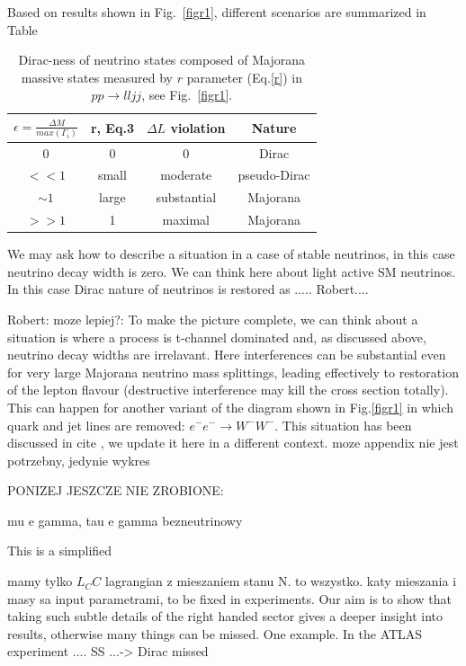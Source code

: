 \documentclass[twocolumn,superscriptaddress,showpacs,prl,nofootinbib,floatfix]{revtex4}
\begin{document}
Based on results shown in Fig.~\ref{figr1}, different scenarios are summarized in Table

\begin{table}[h!]
\begin{tabular}{|c|c|c|c|}
\hline \hline
    $\epsilon=\frac{\Delta M}{max(\Gamma_i)}$ & 
    r, Eq.3 & $\Delta L$ violation   & Nature  \\
\hline
0 & 0 & 
0 & Dirac \\ 
 $<< 1$ & 
   small & moderate   & pseudo-Dirac  \\
  $\sim  1$ & 
   large   &  substantial & Majorana\\
  $>>1$ & 
  1 & maximal & Majorana \\
\hline \hline
\end{tabular}
\caption{Dirac-ness of neutrino states composed of Majorana massive states measured by $r$ parameter (Eq.\ref{r}) in $pp \to lljj$, see Fig.~\ref{figr1}.}
\end{table}

  
We may ask how to describe a situation in a case of stable neutrinos, in this case neutrino decay width is zero. We can think here about light active SM neutrinos. In this case Dirac nature of neutrinos is restored as ..... Robert....

Robert: moze lepiej?:
To make the picture complete, we can think about a situation is where a 
process is t-channel dominated and, as discussed above, neutrino decay widths are irrelavant. Here interferences can be substantial even for very large Majorana neutrino mass splittings, leading effectively to restoration of the lepton flavour (destructive interference may kill the cross section totally). This can happen for another variant of the diagram shown in Fig.\ref{figr1} in which quark and jet lines are removed: $e^-e^- \to W^-W^-$. This situation has been discussed in cite , we update it here in a different context. moze appendix nie jest potrzebny, jedynie wykres

PONIZEJ JESZCZE NIE ZROBIONE:

mu e gamma, tau e gamma bezneutrinowy


This is a simplified 


mamy tylko $L_CC$ lagrangian z mieszaniem stanu N. to wszystko. katy mieszania i masy sa input parametrami, to be fixed in experiments. Our aim is to show that taking such subtle details of the right handed sector gives a deeper insight into results, otherwise many things can be missed. One example. In the ATLAS experiment .... SS ...-> Dirac missed
\end{document}
